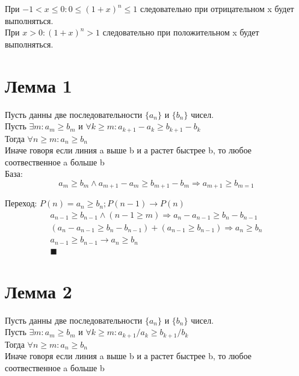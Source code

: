 \documentclass[letterpaper]{article}
\begin{document}
При \(-1 < x \leq 0: 0 \leq (1 + x)^n \leq 1\) следовательно при отрицательном x будет выполняться.\\

При \(x > 0: (1 + x)^n > 1\) следовательно при положительном x будет выполняться.\\
\section{Лемма 1}
\label{sec:orgcb4faad}
Пусть данны две последовательности \(\{a_n\}\) и \(\{b_n\}\) чисел.\\
Пусть \(\exists m: a_m \geq b_m\) и \(\forall k \geq m: a_{k+1} - a_k \geq b_{k+1} - b_k\)\\
Тогда \(\forall n \geq m: a_n \geq b_n\)\\

Иначе говоря если линия a выше b и а растет быстрее b, то любое соотвественное a больше b\\

База:\\
\begin{equation}
a_m \geq b_m \land
a_{m+1} - a_m \geq b_{m+1} - b_m \Rightarrow
a_{m+1} \geq b_{m=1}
\end{equation}

Переход: \(P(n) = a_n \geq b_n; P(n - 1) \rightarrow P(n)\)\\
\begin{equation}
\begin{aligned}
a_{n-1} \geq b_{n-1} \land (n - 1 \geq m) \Rightarrow a_n - a_{n-1} \geq b_n - b_{n-1} \\
(a_n - a_{n-1} \geq b_n - b_{n-1}) + (a_{n-1} \geq b_{n-1}) \Rightarrow a_n \geq b_n \\
a_{n-1} \geq b_{n-1} \rightarrow a_n \geq b_n \\
\blacksquare
\end{aligned}
\end{equation}
\section{Лемма 2}
\label{sec:orge8cb263}
Пусть данны две последовательности \(\{a_n\}\) и \(\{b_n\}\) чисел.\\
Пусть \(\exists m: a_m \geq b_m\) и \(\forall k \geq m: a_{k+1} / a_k \geq b_{k+1} / b_k\)\\
Тогда \(\forall n \geq m: a_n \geq b_n\)\\

Иначе говоря если линия a выше b и а растет быстрее b, то любое соотвественное a больше b\\
\end{document}
